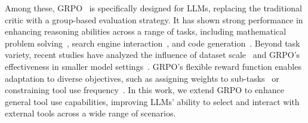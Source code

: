 Among these, GRPO~\cite{shao2024deepseekmath} is specifically designed for LLMs, replacing the traditional critic with a group-based evaluation strategy. It has shown strong performance in enhancing reasoning abilities across a range of tasks, including mathematical problem solving~\cite{shao2024deepseekmath, xie2025logic}, search engine interaction~\cite{jin2025search, song2025r1}, and code generation~\cite{li2025torl}. Beyond task variety, recent studies have analyzed the influence of dataset scale~\cite{li2025limr} and GRPO's effectiveness in smaller model settings~\cite{dang2025reinforcement}. GRPO’s flexible reward function enables adaptation to diverse objectives, such as assigning weights to sub-tasks~\cite{yu2024steptool} or constraining tool use frequency~\cite{li2025torl}. In this work, we extend GRPO to enhance general tool use capabilities, improving LLMs' ability to select and interact with external tools across a wide range of scenarios. 
